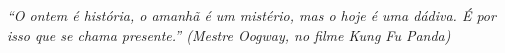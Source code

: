 %
%

\begin{epigrafe}

\textit{``O ontem é história, o amanhã é um mistério, mas o hoje é uma dádiva. É por isso que se chama presente.'' (Mestre Oogway, no filme Kung Fu Panda)}

\end{epigrafe}
